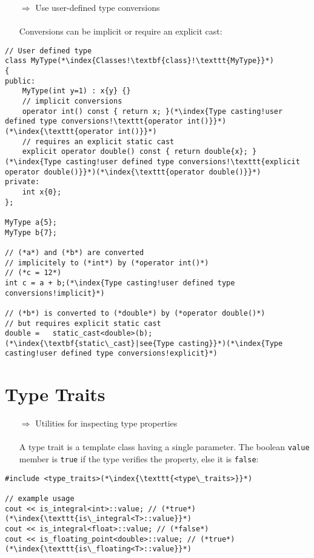 \documentclass[10pt]{book}
\begin{document}
\begin{enumerate}
\item[$\Rightarrow$] Use user-defined type conversions\\ \\ Conversions can be implicit or require an explicit cast:
\end{enumerate}
\begin{lstlisting}
// User defined type
class MyType(*\index{Classes!\textbf{class}!\texttt{MyType}}*)
{
public:
    MyType(int y=1) : x{y} {}
    // implicit conversions
    operator int() const { return x; }(*\index{Type casting!user defined type conversions!\texttt{operator int()}}*)(*\index{\texttt{operator int()}}*)
    // requires an explicit static cast
    explicit operator double() const { return double{x}; }(*\index{Type casting!user defined type conversions!\texttt{explicit operator double()}}*)(*\index{\texttt{operator double()}}*)
private:
    int x{0};
};

MyType a{5};
MyType b{7};

// (*a*) and (*b*) are converted
// implicitely to (*int*) by (*operator int()*)
// (*c = 12*)
int c = a + b;(*\index{Type casting!user defined type conversions!implicit}*)

// (*b*) is converted to (*double*) by (*operator double()*)
// but requires explicit static cast
double =   static_cast<double>(b);(*\index{\textbf{static\_cast}|see{Type casting}}*)(*\index{Type casting!user defined type conversions!explicit}*)
\end{lstlisting}
%
%
\section{Type Traits}
\begin{enumerate}
\item[$\Rightarrow$] Utilities for inspecting type properties \\ \\A type trait is a template class having a single parameter. The boolean \texttt{value} member is \texttt{true} if the type verifies the property, else it is \texttt{false}:
\end{enumerate}
\begin{lstlisting}
#include <type_traits>(*\index{\texttt{<type\_traits>}}*)

// example usage
cout << is_integral<int>::value; // (*true*)(*\index{\texttt{is\_integral<T>::value}}*)
cout << is_integral<float>::value; // (*false*)
cout << is_floating_point<double>::value; // (*true*)(*\index{\texttt{is\_floating<T>::value}}*)
\end{lstlisting}
%
%
\end{document}

